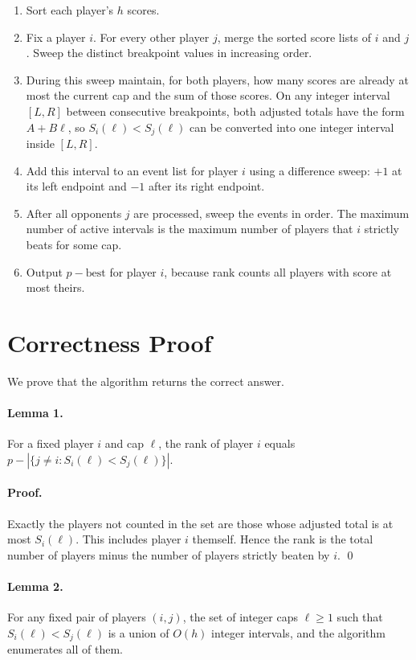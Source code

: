 \documentclass[11pt]{article}
\begin{document}
\begin{enumerate}[leftmargin=*]
    \item Sort each player's $h$ scores.
    \item Fix a player $i$. For every other player $j$, merge the sorted score lists of $i$ and $j$.
    Sweep the distinct breakpoint values in increasing order.
    \item During this sweep maintain, for both players, how many scores are already at most the current
    cap and the sum of those scores. On any integer interval $[L,R]$ between consecutive breakpoints,
    both adjusted totals have the form $A+B\ell$, so $S_i(\ell)<S_j(\ell)$ can be converted into one
    integer interval inside $[L,R]$.
    \item Add this interval to an event list for player $i$ using a difference sweep: $+1$ at its left
    endpoint and $-1$ after its right endpoint.
    \item After all opponents $j$ are processed, sweep the events in order. The maximum number of active
    intervals is the maximum number of players that $i$ strictly beats for some cap.
    \item Output $p-\text{best}$ for player $i$, because rank counts all players with score at most theirs.
\end{enumerate}

\section*{Correctness Proof}

We prove that the algorithm returns the correct answer.

\paragraph{Lemma 1.}
For a fixed player $i$ and cap $\ell$, the rank of player $i$ equals
$p - |\{j \neq i : S_i(\ell) < S_j(\ell)\}|$.

\paragraph{Proof.}
Exactly the players not counted in the set are those whose adjusted total is at most $S_i(\ell)$.
This includes player $i$ themself. Hence the rank is the total number of players minus the number of
players strictly beaten by $i$. \qed

\paragraph{Lemma 2.}
For any fixed pair of players $(i,j)$, the set of integer caps $\ell \ge 1$ such that
$S_i(\ell) < S_j(\ell)$ is a union of $O(h)$ integer intervals, and the algorithm enumerates all of them.
\end{document}
